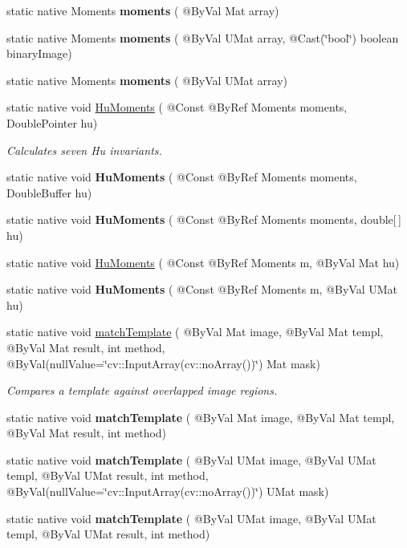 \begin{DoxyCompactItemize}
\item 
static native Moments {\bfseries moments} ( @By\+Val Mat array)
\item 
static native Moments {\bfseries moments} ( @By\+Val U\+Mat array, @Cast(\char`\"{}bool\char`\"{}) boolean binary\+Image)
\item 
static native Moments {\bfseries moments} ( @By\+Val U\+Mat array)
\item 
static native void \hyperlink{group__imgproc__shape_ga352b5f00f51966f12301dfd255d06189}{Hu\+Moments} ( @Const @By\+Ref Moments moments, Double\+Pointer hu)
\begin{DoxyCompactList}\small\item\em Calculates seven Hu invariants. \end{DoxyCompactList}\item 
static native void {\bfseries Hu\+Moments} ( @Const @By\+Ref Moments moments, Double\+Buffer hu)
\item 
static native void {\bfseries Hu\+Moments} ( @Const @By\+Ref Moments moments, double\mbox{[}$\,$\mbox{]} hu)
\item 
static native void \hyperlink{group__imgproc__shape_gab567ad055b6ac17d75b8f78044f7c2d4}{Hu\+Moments} ( @Const @By\+Ref Moments m, @By\+Val Mat hu)
\item 
static native void {\bfseries Hu\+Moments} ( @Const @By\+Ref Moments m, @By\+Val U\+Mat hu)
\item 
static native void \hyperlink{group__imgproc__object_ga9a21de5c468f2b954413017382a99d29}{match\+Template} ( @By\+Val Mat image, @By\+Val Mat templ, @By\+Val Mat result, int method, @By\+Val(null\+Value=\char`\"{}cv\+::\+Input\+Array(cv\+::no\+Array())\char`\"{}) Mat mask)
\begin{DoxyCompactList}\small\item\em Compares a template against overlapped image regions. \end{DoxyCompactList}\item 
static native void {\bfseries match\+Template} ( @By\+Val Mat image, @By\+Val Mat templ, @By\+Val Mat result, int method)
\item 
static native void {\bfseries match\+Template} ( @By\+Val U\+Mat image, @By\+Val U\+Mat templ, @By\+Val U\+Mat result, int method, @By\+Val(null\+Value=\char`\"{}cv\+::\+Input\+Array(cv\+::no\+Array())\char`\"{}) U\+Mat mask)
\item 
static native void {\bfseries match\+Template} ( @By\+Val U\+Mat image, @By\+Val U\+Mat templ, @By\+Val U\+Mat result, int method)

\end{DoxyCompactItemize}
